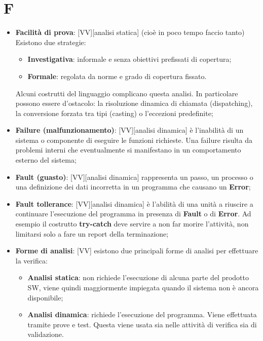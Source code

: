 % 
%
% 
%

\section{F}
	\begin{itemize}

		\item \textbf{Facilità di prova}: [VV][analisi statica] (cioè in poco tempo faccio tanto) Esistono due strategie:
			\begin{itemize}
				\item \textbf{Investigativa}: informale e senza obiettivi prefissati di copertura;
				\item \textbf{Formale}: regolata da norme e grado di copertura fissato.
			\end{itemize}
			\noindent
			Alcuni costrutti del linguaggio complicano questa analisi. In particolare possono essere d'ostacolo: la risoluzione dinamica di chiamata (dispatching), la conversione forzata tra tipi (casting) o l'eccezioni predefinite;

		\item \textbf{Failure (malfunzionamento)}: [VV][analisi dinamica] è l'inabilità di un sistema o componente di eseguire le funzioni richieste. Una failure risulta da problemi interni che eventualmente si manifestano in un comportamento esterno del sistema;

		\item \textbf{Fault (guasto)}: [VV][analisi dinamica] rappresenta un passo, un processo o una definizione dei dati incorretta in un programma che causano un \textbf{Error};
		\item \textbf{Fault tollerance}: [VV][analisi dinamica] è l'abilità di una unità a riuscire a continuare l'esecuzione del programma in presenza di \textbf{Fault} o di \textbf{Error}. Ad esempio il costrutto \textbf{try-catch} deve servire a non far morire l'attività, non limitarsi solo a fare un report della terminazione;

		\item \textbf{Forme di analisi}: [VV] esistono due principali forme di analisi per effettuare la verifica:
			\begin{itemize}
				\item \textbf{Analisi statica}: non richiede l'esecuzione di alcuna parte del prodotto SW, viene quindi maggiormente impiegata quando il sistema non è ancora disponibile;
				\item \textbf{Analisi dinamica}: richiede l'esecuzione del programma. Viene effettuata tramite prove e test. Questa viene usata sia nelle attività di verifica sia di validazione.
			\end{itemize}


\end{itemize}
